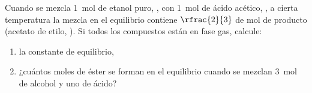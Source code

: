 Cuando se mezcla \SI{1}{\mol} de etanol puro, , con \SI{1}{\mol} de ácido acético, , a cierta temperatura la mezcla en el equilibrio contiene $\rfrac{2}{3}$ de \si{\mol} de producto (acetato de etilo, ). Si todos los compuestos están en fase gas, calcule:
\begin{enumerate}[label={\alph*)},font=\bfseries]
	\item la constante de equilibrio,
	\item ¿cuántos moles de éster se forman en el equilibrio cuando se mezclan \SI{3}{\mol} de alcohol y uno de ácido?
\end{enumerate}
